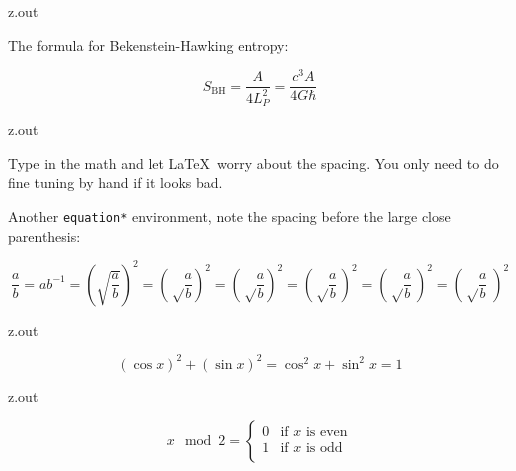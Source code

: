 \MyIOT


\begin{VerbatimOut}{z.out}

The formula for Bekenstein-Hawking entropy:

\begin{equation*}
  S_\text{BH} = \frac A{4L_P^2} = \frac{c^3A}{4G\hbar}
\end{equation*}
\end{VerbatimOut}

\MyIOT


\begin{VerbatimOut}{z.out}

Type in the math and let \LaTeX\ worry about the spacing.
You only need to do fine tuning by hand if it looks bad.  

Another \verb+equation*+ environment,
note the spacing before the large close parenthesis:

\begin{equation*}
  \frac ab = ab^{-1}
    = (\sqrt{\frac ab})^2
    = \left( \sqrt\frac ab \right)^2
    = \left( \sqrt\frac ab \!\right)^2
    = \left( \sqrt\frac ab \,\right)^2
    = \left( \sqrt\frac ab \:\right)^2
    = \left( \sqrt\frac ab \;\right)^2
\end{equation*}
\end{VerbatimOut}

\MyIOT


\begin{VerbatimOut}{z.out}

\begin{equation*}
  (\cos x)^2 + (\sin x)^2 = \cos^2 x + \sin^2 x = 1
\end{equation*}
\end{VerbatimOut}

\MyIOT


\begin{VerbatimOut}{z.out}

\begin{equation}
  x \mod 2 =
  \begin{cases}
    0& \text{if $x$ is even}\\
    1& \text{if $x$ is odd}\\
  \end{cases}
\end{equation}
\end{VerbatimOut}


